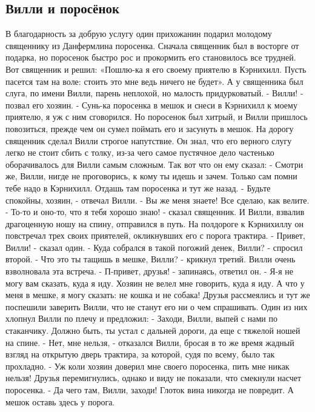 \newpage

\subsection*{Вилли и поросёнок}

В благодарность за добрую услугу один прихожанин подарил молодому священнику из Данфермлина поросенка.
Сначала священник был в восторге от подарка, но поросенок быстро рос и прокормить его становилось все трудней. Вот священник и решил: «Пошлю-ка я его своему приятелю в Кэрнихилл. Пусть пасется там на воле: стоить это мне ведь ничего не будет».
А у священника был слуга, по имени Вилли, парень неплохой, но малость придурковатый.
- Вилли! - позвал его хозяин. - Сунь-ка поросенка в мешок и снеси в Кэрнихилл к моему приятелю, я уж с ним сговорился.
Но поросенок был хитрый, и Вилли пришлось повозиться, прежде чем он сумел поймать его и засунуть в мешок.
На дорогу священник сделал Вилли строгое напутствие. Он знал, что его верного слугу легко не стоит сбить с толку, из-за чего самое пустячное дело частенько оборачивалось для Вилли самым сложным. Так вот что он ему сказал:
- Смотри же, Вилли, нигде не проговорись, к кому ты идешь и зачем. Только сам помни тебе надо в Кэрнихилл. Отдашь там поросенка и тут же назад.
- Будьте спокойны, хозяин, - отвечал Вилли. - Вы же меня знаете! Все сделаю, как велите.
- То-то и оно-то, что я тебя хорошо знаю! - сказал священник.
И Вилли, взвалив драгоценную ношу на спину, отправился в путь. На полдороге к Кэрнихиллу он повстречал трех своих приятелей, окликнувших его с порога трактира.
- Привет, Вилли! - сказал один.
- Куда собрался в такой погожий денек, Вилли? - спросил второй.
- Что это ты тащишь в мешке, Вилли? - крикнул третий.
Вилли очень взволновала эта встреча.
- П-привет, друзья! - запинаясь, ответил он. - Я-я не могу вам сказать, куда я иду. Хозяин не велел мне говорить, куда я иду. А что у меня в мешке, я могу сказать: не кошка и не собака!
Друзья рассмеялись и тут же поспешили заверить Вилли, что не станут его ни о чем спрашивать. Один из них хлопнул Вилли по плечу и предложил:
- Заходи, Вилли, выпей с нами по стаканчику. Должно быть, ты устал с дальней дороги, да еще с тяжелой ношей на спине.
- Нет, мне нельзя, - отказался Вилли, бросая в то же время жадный взгляд на открытую дверь трактира, за которой, судя по всему, было так прохладно. - Уж коли хозяин доверил мне своего поросенка, пить мне никак нельзя!
Друзья перемигнулись, однако и виду не показали, что смекнули насчет поросенка.
- Да чего там, Вилли, заходи! Глоток вина никогда не повредит. А мешок оставь здесь у порога.
